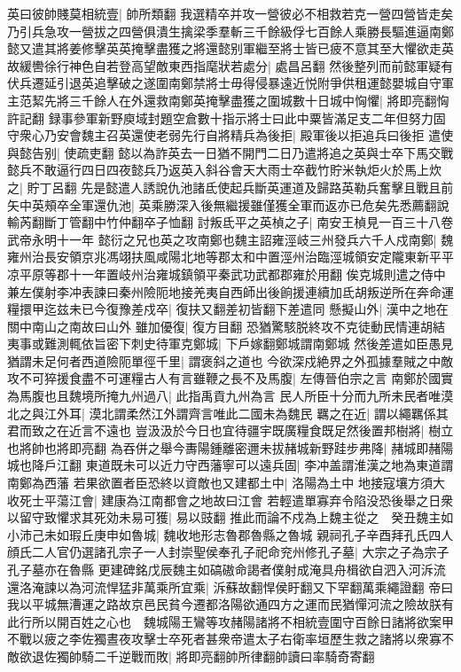 英曰彼帥賤莫相統壹|{
	帥所類翻}
我選精卒并攻一營彼必不相救若克一營四營皆走矣乃引兵急攻一營拔之四營俱潰生擒梁季羣斬三千餘級俘七百餘人乘勝長驅進逼南鄭懿又遣其將姜修擊英英掩擊盡獲之將還懿别軍繼至將士皆已疲不意其至大懼欲走英故緩轡徐行神色自若登高望敵東西指麾狀若處分|{
	處昌呂翻}
然後整列而前懿軍疑有伏兵遷延引退英追擊破之遂圍南鄭禁將士毋得侵暴遠近悦附爭供租運懿嬰城自守軍主范絜先將三千餘人在外還救南鄭英掩擊盡獲之圍城數十日城中恟懼|{
	將即亮翻恟許記翻}
録事參軍新野庾域封題空倉數十指示將士曰此中粟皆滿足支二年但努力固守衆心乃安會魏主召英還使老弱先行自將精兵為後拒|{
	殿軍後以拒追兵曰後拒}
遣使與懿告别|{
	使疏吏翻}
懿以為詐英去一日猶不開門二日乃遣將追之英與士卒下馬交戰懿兵不敢逼行四日四夜懿兵乃返英入斜谷會天大雨士卒截竹貯米執炬火於馬上炊之|{
	貯丁呂翻}
先是懿遣人誘說仇池諸氐使起兵斷英運道及歸路英勒兵奮擊且戰且前矢中英頰卒全軍還仇池|{
	英乘勝深入後無繼援雖僅獲全軍而返亦已危矣先悉薦翻說輸芮翻斷丁管翻中竹仲翻卒子恤翻}
討叛氐平之英楨之子|{
	南安王楨見一百三十八卷武帝永明十一年}
懿衍之兄也英之攻南鄭也魏主詔雍涇岐三州發兵六千人戍南鄭|{
	魏雍州治長安領京兆馮翊扶風咸陽北地等郡太和中置涇州治臨涇城領安定隴東新平平凉平原等郡十一年置岐州治雍城鎮領平秦武功武都郡雍於用翻}
俟克城則遣之侍中兼左僕射李冲表諫曰秦州險阨地接羌夷自西師出後餉援連續加氐胡叛逆所在奔命運糧擐甲迄兹未已今復豫差戍卒|{
	復扶又翻差初皆翻下差遣同}
懸擬山外|{
	漢中之地在關中南山之南故曰山外}
雖加優復|{
	復方目翻}
恐猶驚駭脱終攻不克徒動民情連胡結夷事或難測輒依旨密下刺史待軍克鄭城|{
	下戶嫁翻鄭城謂南鄭城}
然後差遣如臣愚見猶謂未足何者西道險阨單徑千里|{
	謂褒斜之道也}
今欲深戍絶界之外孤據羣賊之中敵攻不可猝援食盡不可運糧古人有言雖鞭之長不及馬腹|{
	左傳晉伯宗之言}
南鄭於國實為馬腹也且魏境所掩九州過八|{
	此指禹貢九州為言}
民人所臣十分而九所未民者唯漠北之與江外耳|{
	漠北謂柔然江外謂齊言唯此二國未為魏民}
羈之在近|{
	謂以繩羈係其君而致之在近言不遠也}
豈汲汲於今日也宜待疆宇既廣糧食既足然後置邦樹將|{
	樹立也將帥也將即亮翻}
為吞併之舉今夀陽鍾離密邇未拔赭城新野跬步弗降|{
	赭城即赭陽城也降戶江翻}
東道既未可以近力守西藩寧可以遠兵固|{
	李冲盖謂淮漢之地為東道謂南鄭為西藩}
若果欲置者臣恐終以資敵也又建都土中|{
	洛陽為土中}
地接寇壤方須大收死士平蕩江會|{
	建康為江南都會之地故曰江會}
若輕遣單寡弃令陷没恐後舉之日衆以留守致懼求其死効未易可獲|{
	易以豉翻}
推此而論不戍為上魏主從之　癸丑魏主如小沛己未如瑕丘庚申如魯城|{
	魏收地形志魯郡魯縣之魯城}
親祠孔子辛酉拜孔氏四人顔氏二人官仍選諸孔宗子一人封崇聖侯奉孔子祀命兖州修孔子墓|{
	大宗之子為宗子孔子墓亦在魯縣}
更建碑銘戊辰魏主如碻磝命謁者僕射成淹具舟楫欲自泗入河泝流還洛淹諫以為河流悍猛非萬乘所宜乘|{
	泝蘇故翻悍侯盱翻又下罕翻萬乘繩證翻}
帝曰我以平城無漕運之路故京邑民貧今遷都洛陽欲通四方之運而民猶憚河流之險故朕有此行所以開百姓之心也　魏城陽王鸞等攻赭陽諸將不相統壹圍守百餘日諸將欲案甲不戰以疲之李佐獨晝夜攻擊士卒死者甚衆帝遣太子右衛率垣歷生救之諸將以衆寡不敵欲退佐獨帥騎二千逆戰而敗|{
	將即亮翻帥所律翻帥讀曰率騎奇寄翻}
